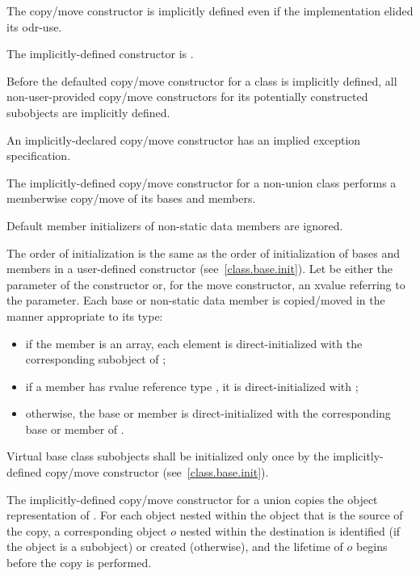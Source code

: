 \pnum
\begin{note}
The copy/move constructor is implicitly defined even if the implementation elided
its odr-use.
\end{note}
The implicitly-defined
constructor is .

\pnum
Before the defaulted copy/move constructor for a class is
implicitly defined,
all non-user-provided copy/move constructors for its
potentially constructed subobjects
are implicitly defined.
\begin{note}
An implicitly-declared copy/move constructor has an
implied exception specification.
\end{note}

\pnum
The implicitly-defined copy/move constructor for a non-union class
performs a memberwise copy/move of its bases and members.
\begin{note}
Default member initializers of non-static data members are ignored.
\end{note}
The order of initialization is the same as the order of initialization of bases
and members in a user-defined constructor (see~\ref{class.base.init}).
Let  be either the parameter of the constructor or, for the move constructor, an
xvalue referring to the parameter.
Each base or non-static data member
is copied/moved in the manner appropriate to its type:
\begin{itemize}
\item
if the member is an array, each element is
direct-initialized with the corresponding subobject of ;

\item
if a member  has rvalue reference type , it is direct-initialized with
;

\item
otherwise, the base or member is direct-initialized with the corresponding base or member of .
\end{itemize}

%
Virtual base class subobjects shall be initialized only once by
the implicitly-defined copy/move constructor (see~\ref{class.base.init}).

\pnum
The implicitly-defined copy/move constructor for a union
 copies the object representation of .
For each object nested within
the object that is the source of the copy,
a corresponding object $o$ nested within the destination
is identified (if the object is a subobject) or created (otherwise),
and the lifetime of $o$ begins before the copy is performed.

